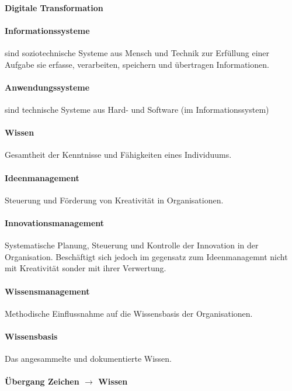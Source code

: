 \documentclass[twocolumn]{article}
\begin{document}
\paragraph{Digitale Transformation\\} 

\paragraph{Informationssysteme} sind soziotechnische Systeme aus Mensch und Technik zur Erfüllung einer Aufgabe sie erfasse, verarbeiten, speichern und übertragen Informationen.

\paragraph{Anwendungssysteme} sind technische Systeme aus Hard- und Software (im Informationssystem)


\paragraph{Wissen}
	Gesamtheit der Kenntnisse und Fähigkeiten eines Individuums.

\paragraph{Ideenmanagement}
	Steuerung und Förderung von Kreativität in Organisationen.

\paragraph{Innovationsmanagement}
	Systematische Planung, Steuerung und Kontrolle der Innovation in der Organisation. Beschäftigt sich jedoch im gegensatz zum Ideenmanagemnt nicht mit Kreativität sonder mit ihrer Verwertung.

\paragraph{Wissensmanagement}
	Methodische Einflussnahme auf die Wissensbasis der Organisationen.

\paragraph{Wissensbasis}
	Das angesammelte und dokumentierte Wissen.

\paragraph{Übergang Zeichen $\rightarrow$ Wissen \\}
\end{document}
